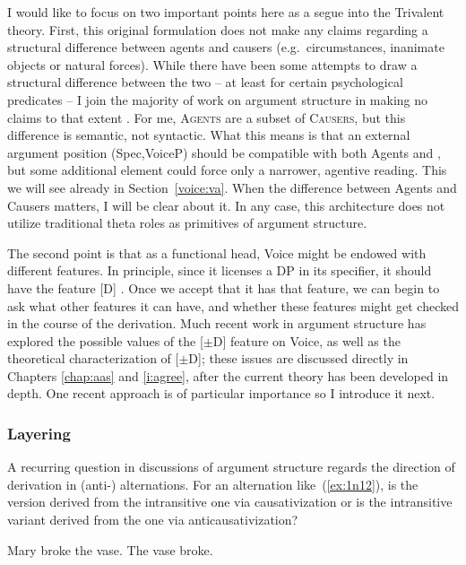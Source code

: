 \begin{exe}
\begin{xlist}
\begin{exe}
\begin{exe}
\begin{exe}
\begin{exe}
\begin{xlist}
\begin{exe}
\begin{xlist}
\begin{xlist}
\begin{xlist}
\begin{exe}
\begin{xlist}
\begin{exe}
\begin{exe}
\begin{xlist}
I would like to focus on two important points here as a segue into the Trivalent theory. First, this original formulation does not make any claims regarding a structural difference between agents and causers (e.g.~circumstances, inanimate objects or natural forces). While there have been some attempts to draw a structural difference between the two -- at least for certain psychological predicates \citep{bellettirizzi88,harleystone13} -- I join the majority of work on argument structure in making no claims to that extent \citep[7]{layering15}. For me, \textsc{Agents} are a subset of \textsc{Causers}, but this difference is semantic, not syntactic. What this means is that an external argument position (Spec,VoiceP) should be compatible with both Agents and , but some additional element could force only a narrower, agentive reading. This we will see already in Section~\ref{voice:va}. When the difference between Agents and Causers matters, I will be clear about it. In any case, this architecture does not utilize traditional theta roles as primitives of argument structure.

The second point is that as a functional head, Voice might be endowed with different features. In principle, since it licenses a DP in its specifier, it should have the  feature [D] \citep{chomsky95}. Once we accept that it has that feature, we can begin to ask what other features it can have, and whether these features might get checked in the course of the derivation. Much recent work in argument structure has explored the possible values of the [$\pm$D] feature on Voice, as well as the theoretical characterization of [$\pm$D]; these issues are discussed directly in Chapters \ref{chap:aas} and \ref{i:agree}, after the current theory has been developed in depth. One recent approach is of particular importance so I introduce it next.\label{r1:g:2a1}

		\subsubsection{Layering} \label{intro:arch:layering}
A recurring question in discussions of argument structure regards the direction of derivation in (anti-) alternations. For an alternation like~(\ref{ex:1n12}), is the  version derived from the intransitive one via causativization or is the intransitive variant derived from the  one via anticausativization?

 \begin{exe}
 \ex  \label{ex:1n12}
 \begin{xlist} 
 	\ex  Mary broke the vase. 
 	\ex  The vase broke. 
 \z
\z 


\end{xlist}
\end{exe}
\end{xlist}
\end{exe}
\end{exe}
\end{xlist}
\end{exe}
\end{xlist}
\end{xlist}
\end{xlist}
\end{exe}
\end{xlist}
\end{exe}
\end{exe}
\end{exe}
\end{exe}
\end{xlist}
\end{exe}
